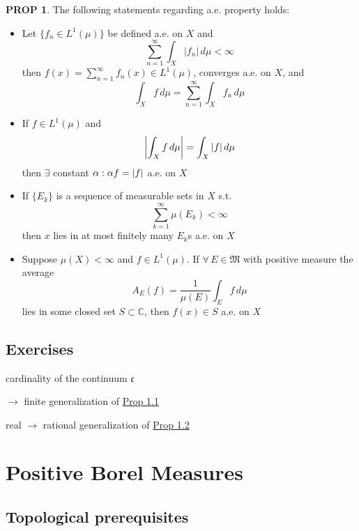 \documentclass[hidelinks,10pt]{article}
\theoremstyle{definition}
\theoremstyle{dotles}
\newenvironment{exercise}[1]
  {\renewcommand\theinnercustomex{#1}\innercustomex}
  {\endinnercustomex}
\theoremstyle{dotless}
\newtheorem{proposition}{PROP}[section]
\theoremstyle{remark}
\begin{document}
\begin{proposition}
The following statements regarding a.e. property holds:\begin{itemize}
    \item Let $\{f_n\in L^1(\mu)\}$ be defined a.e. on $X$ and
    \[\sum_{n=1}^\infty\int_X|f_n|\,d\mu<\infty\]
    then $f(x)=\sum_{n=1}^\infty f_n(x)\in L^1(\mu)$, converges a.e. on $X$, and
    \[\int_Xf\,d\mu=\sum_{n=1}^\infty\int_Xf_n\,d\mu\]
    \item If $f\in L^1(\mu)$ and
    \[\abs{\int_Xf\,d\mu}=\int_X\abs{f}\,d\mu\]
    then $\exists$ constant $\alpha:\alpha f=\abs{f}$ a.e. on $X$
    \item If $\{E_k\}$ is a sequence of measurable sets in $X$ s.t.
    \[\sum_{k=1}^\infty\mu(E_k)<\infty\]
    then $x$ lies in at most finitely many $E_k$s a.e. on $X$
    \item Suppose $\mu(X)<\infty$ and $f\in L^1(\mu)$. If $\forall\,E\in\mathfrak{M}$ with positive measure the average
    \[A_E(f)=\frac{1}{\mu(E)}\int_Ef\,d\mu\]
    lies in some closed set $S\subset\mathbb{C}$, then $f(x)\in S$ a.e. on $X$
\end{itemize}
\end{proposition}

\subsection*{Exercises}

\begin{exercise}{1.1}
cardinality of the continuum $\mathfrak{c}$
\end{exercise}

\begin{exercise}{1.2}
2 $\rightarrow$ finite generalization of \hyperref[Prop 1.1]{Prop 1.1}
\end{exercise}

\begin{exercise}{1.3}
real $\rightarrow$ rational generalization of \hyperref[Prop 1.2]{Prop 1.2}
\end{exercise}

\newpage

\section{Positive Borel Measures}

\subsection{Topological prerequisites}
\end{document}
